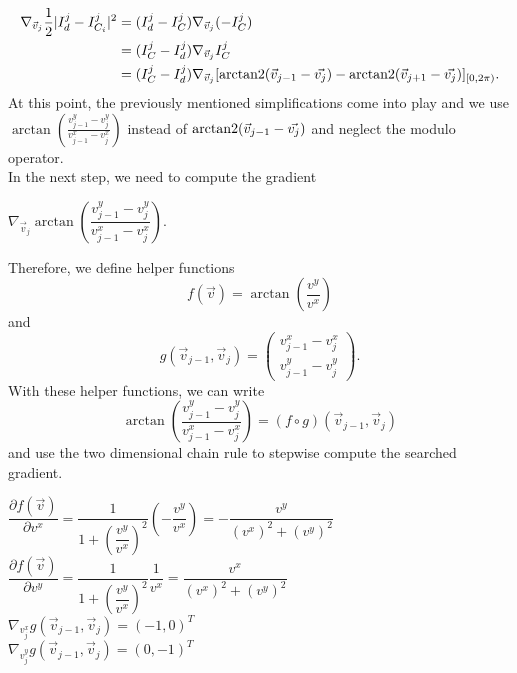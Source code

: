 \begin{proposition}
	\begin{align*}
		\nabla_{\vec{v}_j} \frac{1}{2}| I^{j}_d - I^{j}_{C_i} |^2 
		&= (I^{j}_d - I^j_{C}) \nabla_{\vec{v}_j} (- I^j_{C})\\
		&= (I^j_{C} - I^{j}_d) \nabla_{\vec{v}_j}  I^j_{C}   \\
		&= (I^j_{C} - I^{j}_d) \nabla_{\vec{v}_j} [\operatorname{arctan2}(\vec{v}_{j-1} - \vec{v_j}) - \operatorname{arctan2}(\vec{v}_{j+1} - \vec{v_j})]_{[0,2\pi)}.
	\end{align*}
	At this point, the previously mentioned simplifications come into play and we use $\arctan \left(\frac{v_{j-1}^{y} - v_{j}^{y}}{v_{j-1}^{x} - v_{j}^{x}} \right)$ instead of $\operatorname{arctan2}(\vec{v}_{j-1} - \vec{v_j})$ and neglect the modulo operator. \\
	In the next step, we need to compute the gradient 
	\begin{center}
		$
		\nabla_{\vec{v}_j} \arctan \left(\dfrac{v_{j-1}^{y} - v_{j}^{y}}{v_{j-1}^{x} - v_{j}^{x}} \right).
		$
	\end{center}
	
	Therefore, we define helper functions 
	$$ f(\vec{v}) = \arctan\left( \frac{v^{y}}{v^{x}} \right)$$ 
	and 
	$$g(\vec{v}_{j-1}, \vec{v}_{j}) = \begin{pmatrix}
		v_{j-1}^{x} - v_{j}^{x} \\[0.5em] 
		v_{j-1}^{y} - v_{j}^{y}
	\end{pmatrix}.$$
	With these helper functions, we can write 
	$$ \arctan\left(\frac{v_{j-1}^{y} - v_{j}^{y}}{v_{j-1}^{x} - v_{j}^{x}}\right) = (f \circ g) (\vec{v}_{j-1}, \vec{v}_{j}) $$
	and use the two dimensional chain rule to stepwise compute the searched gradient. 
 
	\begin{center}
		
		$\dfrac{\partial f(\vec{v})}{\partial v^{x}} = \dfrac{1}{1 + \left(\dfrac{v^{y}}{v^{x}}\right)^2} \left(- \dfrac{v^{y}}{v^{x}}\right) = - \dfrac{v^{y}}{(v^{x})^2 + (v^{y})^2}$ \\
		$\dfrac{\partial f(\vec{v})}{\partial v^{y}} = \dfrac{1}{1 + \left(\dfrac{v^{y}}{v^{x}}\right)^2}  \dfrac{1}{v^{x}} =  \dfrac{v^{x}}{(v^{x})^2 + (v^{y})^2}$ \\ [0.5em]
		$ \nabla_{v_j^{x}} g(\vec{v}_{j-1}, \vec{v}_{j}) = (-1, 0)^T$ \\
		$ \nabla_{v_j^{y}} g(\vec{v}_{j-1}, \vec{v}_{j}) = (0, -1)^T$ 
	
	\end{center}


\end{proposition}

